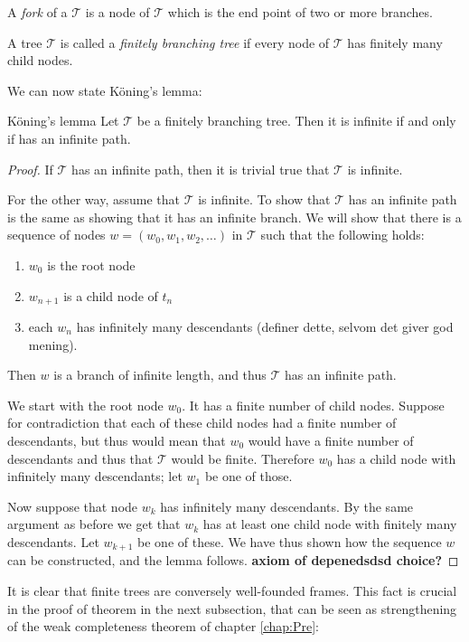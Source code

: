 \documentclass[../main.tex]{subfiles}
\begin{document}
\begin{defi}
	A \textit{fork} of a $\mathcal{T}$ is a node of $\mathcal{T}$ which is the end
	point of two or more branches.
\end{defi}
\begin{defi}
	A tree $\mathcal{T}$ is called a \textit{finitely branching tree} if
	every node of $\mathcal{T}$ has finitely many child nodes.
\end{defi}

We can now state Köning's lemma:
\begin{lemma}{Köning's lemma}
	\label{lem:kong}
	Let $\mathcal{T}$ be a finitely branching tree. Then it is infinite if
	and only if has an infinite path.
\end{lemma}
\begin{proof}
	If $\mathcal{T}$ has an infinite path, then it is trivial true that
	$\mathcal{T}$ is infinite. 

	For the other way, assume that $\mathcal{T}$ is infinite. To show that
	$\mathcal{T}$ has an infinite path is the same as showing that it has
	an infinite branch. We will show that there is a sequence of nodes
	$w=(w_0,w_1,w_2,\ldots)$ in $\mathcal{T}$ such that the following holds:
	\begin{enumerate}
		\item $w_0$ is the root node
		\item $w_{n+1}$ is a child node of $t_n$
		\item each $w_n$ has infinitely many descendants (definer
			dette, selvom det giver god mening).
	\end{enumerate}
	Then $w$ is a branch of infinite length, and thus $\mathcal{T}$ has an
	infinite path.

	We start with the root node $w_0$. It has a finite number of child
	nodes. Suppose for contradiction that each of these child nodes had a
	finite number of descendants, but thus would mean that $w_0$ would have
	a finite number of descendants and thus that $\mathcal{T}$ would be
	finite. Therefore $w_0$ has a child node with infinitely many
	descendants; let $w_1$ be one of those.

	Now suppose that node $w_k$ has infinitely many descendants. By the
	same argument as before we get that $w_k$ has at least one child node
	with finitely many descendants. Let $w_{k+1}$ be one of these. We have
	thus shown how the sequence $w$ can be constructed, and the lemma
	follows. \textbf{axiom of depenedsdsd choice?}
\end{proof}
It is clear that finite trees are conversely well-founded frames. This fact is crucial
in the proof of theorem in the next subsection, that can be seen as strengthening of the
weak completeness theorem of chapter \ref{chap:Pre}:
\end{document}
